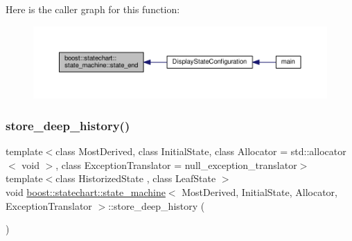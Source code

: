 Here is the caller graph for this function\+:
\nopagebreak
\begin{figure}[H]
\begin{center}
\leavevmode
\includegraphics[width=350pt]{classboost_1_1statechart_1_1state__machine_aab9cfe96af77fbfb10098f9c6ba209a5_icgraph}
\end{center}
\end{figure}
\mbox{\label{classboost_1_1statechart_1_1state__machine_a26b501c3b813c446d450aad3981dbfe3}} 
\subsubsection{\texorpdfstring{store\+\_\+deep\+\_\+history()}{store\_deep\_history()}}
{\footnotesize\ttfamily template$<$class Most\+Derived, class Initial\+State, class Allocator = std\+::allocator$<$ void $>$, class Exception\+Translator = null\+\_\+exception\+\_\+translator$>$ \\
template$<$class Historized\+State , class Leaf\+State $>$ \\
void \mbox{\hyperlink{classboost_1_1statechart_1_1state__machine}{boost\+::statechart\+::state\+\_\+machine}}$<$ Most\+Derived, Initial\+State, Allocator, Exception\+Translator $>$\+::store\+\_\+deep\+\_\+history (\begin{DoxyParamCaption}{ }\end{DoxyParamCaption})\hspace{0.3cm}{\ttfamily [inline]}}

\mbox{\label{classboost_1_1statechart_1_1state__machine_abb755807d8a21c92ec5484d747b05d14}} 

